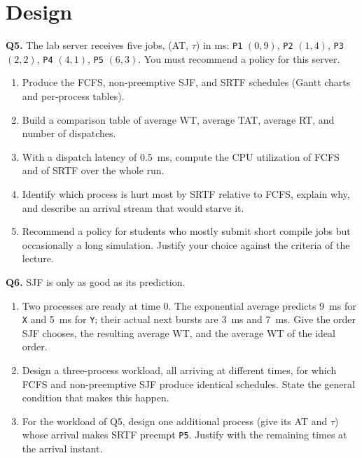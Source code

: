 \documentclass[11pt]{article}
\begin{document}
\section{Design}

\textbf{Q5.} The lab server receives five jobs, (AT, $\tau$) in ms: \texttt{P1} $(0,9)$, \texttt{P2} $(1,4)$, \texttt{P3} $(2,2)$, \texttt{P4} $(4,1)$, \texttt{P5} $(6,3)$. You must recommend a policy for this server.
\begin{enumerate}
  \item[(a)] Produce the FCFS, non-preemptive SJF, and SRTF schedules (Gantt charts and per-process tables).
  \item[(b)] Build a comparison table of average WT, average TAT, average RT, and number of dispatches.
  \item[(c)] With a dispatch latency of 0.5~ms, compute the CPU utilization of FCFS and of SRTF over the whole run.
  \item[(d)] Identify which process is hurt most by SRTF relative to FCFS, explain why, and describe an arrival stream that would starve it.
  \item[(e)] Recommend a policy for students who mostly submit short compile jobs but occasionally a long simulation. Justify your choice against the criteria of the lecture.
\end{enumerate}

\textbf{Q6.} SJF is only as good as its prediction.
\begin{enumerate}
  \item[(a)] Two processes are ready at time 0. The exponential average predicts 9~ms for \texttt{X} and 5~ms for \texttt{Y}; their actual next bursts are 3~ms and 7~ms. Give the order SJF chooses, the resulting average WT, and the average WT of the ideal order.
  \item[(b)] Design a three-process workload, all arriving at different times, for which FCFS and non-preemptive SJF produce identical schedules. State the general condition that makes this happen.
  \item[(c)] For the workload of Q5, design one additional process (give its AT and $\tau$) whose arrival makes SRTF preempt \texttt{P5}. Justify with the remaining times at the arrival instant.
\end{enumerate}



\end{document}
